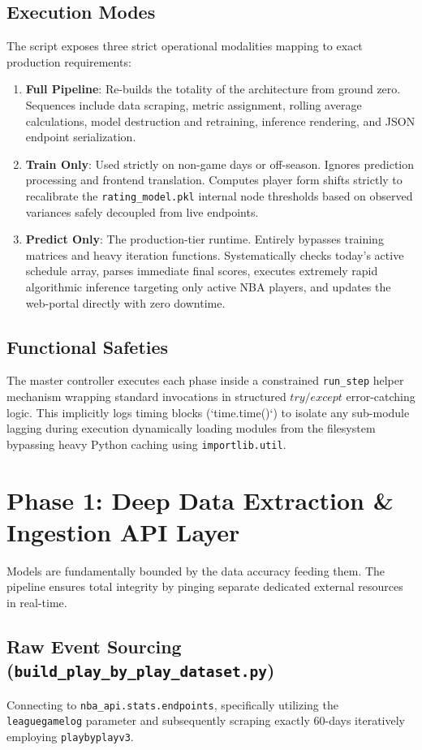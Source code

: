 \documentclass[12pt,a4paper]{article}
\begin{document}
\subsection{Execution Modes}
The script exposes three strict operational modalities mapping to exact production requirements:
\begin{enumerate}
    \item \textbf{Full Pipeline}: Re-builds the totality of the architecture from ground zero. Sequences include data scraping, metric assignment, rolling average calculations, model destruction and retraining, inference rendering, and JSON endpoint serialization.
    \item \textbf{Train Only}: Used strictly on non-game days or off-season. Ignores prediction processing and frontend translation. Computes player form shifts strictly to recalibrate the \texttt{rating\_model.pkl} internal node thresholds based on observed variances safely decoupled from live endpoints.
    \item \textbf{Predict Only}: The production-tier runtime. Entirely bypasses training matrices and heavy iteration functions. Systematically checks today's active schedule array, parses immediate final scores, executes extremely rapid algorithmic inference targeting only active NBA players, and updates the web-portal directly with zero downtime. 
\end{enumerate}

\subsection{Functional Safeties}
The master controller executes each phase inside a constrained \texttt{run\_step} helper mechanism wrapping standard invocations in structured $try / except$ error-catching logic. This implicitly logs timing blocks (`time.time()`) to isolate any sub-module lagging during execution dynamically loading modules from the filesystem bypassing heavy Python caching using \texttt{importlib.util}.

\section{Phase 1: Deep Data Extraction \& Ingestion API Layer}
Models are fundamentally bounded by the data accuracy feeding them. The pipeline ensures total integrity by pinging separate dedicated external resources in real-time.

\subsection{Raw Event Sourcing (\texttt{build\_play\_by\_play\_dataset.py})}
Connecting to \texttt{nba\_api.stats.endpoints}, specifically utilizing the \texttt{leaguegamelog} parameter and subsequently scraping exactly 60-days iteratively employing \texttt{playbyplayv3}.
\end{document}
